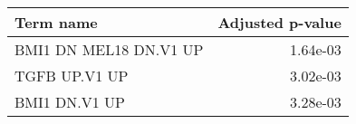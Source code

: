 \begin{tabular}{lr}
\toprule
             Term name &  Adjusted p-value \\
\midrule
BMI1 DN MEL18 DN.V1 UP &          1.64e-03 \\
         TGFB UP.V1 UP &          3.02e-03 \\
         BMI1 DN.V1 UP &          3.28e-03 \\
\bottomrule
\end{tabular}
